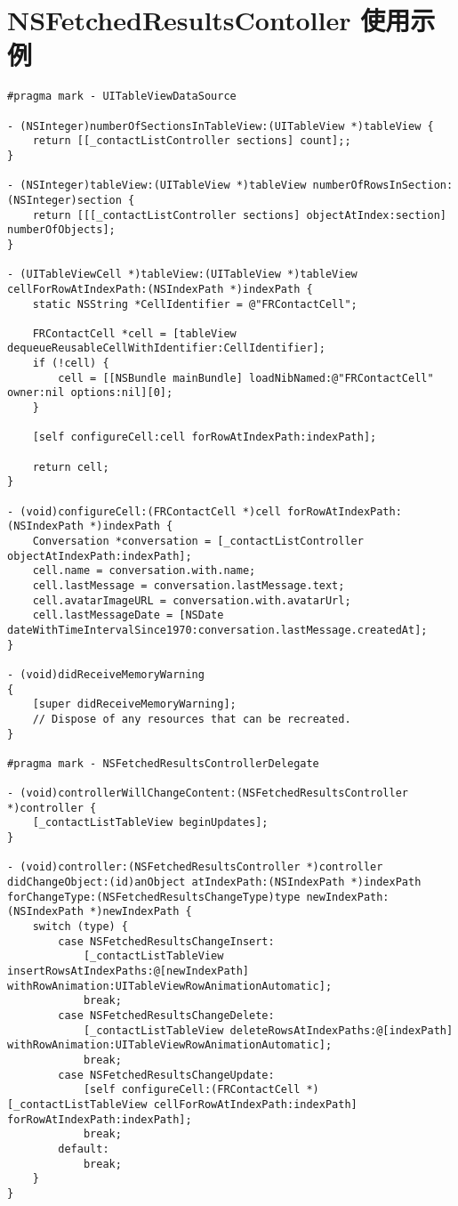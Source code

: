 \chapter{NSFetchedResultsContoller 使用示例}
\label{nsfetchedresultscontroller}

\begin{lstlisting}[caption=NSFetchedResultsContoller 使用示例, label=nsfetchedresultscontroller-code]
#pragma mark - UITableViewDataSource

- (NSInteger)numberOfSectionsInTableView:(UITableView *)tableView {
    return [[_contactListController sections] count];;
}

- (NSInteger)tableView:(UITableView *)tableView numberOfRowsInSection:(NSInteger)section {
    return [[[_contactListController sections] objectAtIndex:section] numberOfObjects];
}

- (UITableViewCell *)tableView:(UITableView *)tableView cellForRowAtIndexPath:(NSIndexPath *)indexPath {
    static NSString *CellIdentifier = @"FRContactCell";

    FRContactCell *cell = [tableView dequeueReusableCellWithIdentifier:CellIdentifier];
    if (!cell) {
        cell = [[NSBundle mainBundle] loadNibNamed:@"FRContactCell" owner:nil options:nil][0];
    }

    [self configureCell:cell forRowAtIndexPath:indexPath];

    return cell;
}

- (void)configureCell:(FRContactCell *)cell forRowAtIndexPath:(NSIndexPath *)indexPath {
    Conversation *conversation = [_contactListController objectAtIndexPath:indexPath];
    cell.name = conversation.with.name;
    cell.lastMessage = conversation.lastMessage.text;
    cell.avatarImageURL = conversation.with.avatarUrl;
    cell.lastMessageDate = [NSDate dateWithTimeIntervalSince1970:conversation.lastMessage.createdAt];
}

- (void)didReceiveMemoryWarning
{
    [super didReceiveMemoryWarning];
    // Dispose of any resources that can be recreated.
}

#pragma mark - NSFetchedResultsControllerDelegate

- (void)controllerWillChangeContent:(NSFetchedResultsController *)controller {
    [_contactListTableView beginUpdates];
}

- (void)controller:(NSFetchedResultsController *)controller didChangeObject:(id)anObject atIndexPath:(NSIndexPath *)indexPath forChangeType:(NSFetchedResultsChangeType)type newIndexPath:(NSIndexPath *)newIndexPath {
    switch (type) {
        case NSFetchedResultsChangeInsert:
            [_contactListTableView insertRowsAtIndexPaths:@[newIndexPath] withRowAnimation:UITableViewRowAnimationAutomatic];
            break;
        case NSFetchedResultsChangeDelete:
            [_contactListTableView deleteRowsAtIndexPaths:@[indexPath] withRowAnimation:UITableViewRowAnimationAutomatic];
            break;
        case NSFetchedResultsChangeUpdate:
            [self configureCell:(FRContactCell *)[_contactListTableView cellForRowAtIndexPath:indexPath] forRowAtIndexPath:indexPath];
            break;
        default:
            break;
    }
}


\end{lstlisting}
